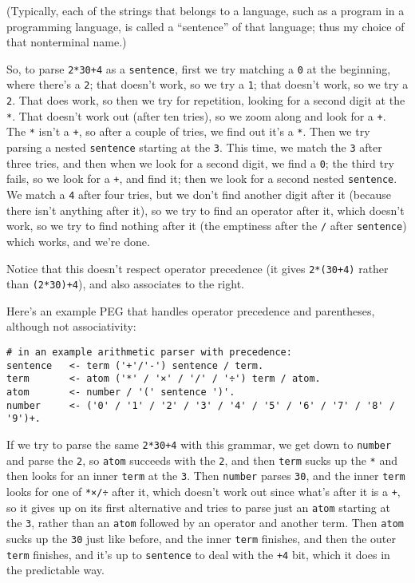 \documentclass[
]{article}
\begin{document}
(Typically, each of the strings that belongs to a language, such as a
program in a programming language, is called a ``sentence'' of that
language; thus my choice of that nonterminal name.)

So, to parse \texttt{2*30+4} as a \texttt{sentence}, first we try
matching a \texttt{0} at the beginning, where there's a \texttt{2}; that
doesn't work, so we try a \texttt{1}; that doesn't work, so we try a
\texttt{2}. That does work, so then we try for repetition, looking for a
second digit at the \texttt{*}. That doesn't work out (after ten tries),
so we zoom along and look for a \texttt{+}. The \texttt{*} isn't a
\texttt{+}, so after a couple of tries, we find out it's a \texttt{*}.
Then we try parsing a nested \texttt{sentence} starting at the
\texttt{3}. This time, we match the \texttt{3} after three tries, and
then when we look for a second digit, we find a \texttt{0}; the third
try fails, so we look for a \texttt{+}, and find it; then we look for a
second nested \texttt{sentence}. We match a \texttt{4} after four tries,
but we don't find another digit after it (because there isn't anything
after it), so we try to find an operator after it, which doesn't work,
so we try to find nothing after it (the emptiness after the \texttt{/}
after \texttt{sentence}) which works, and we're done.

Notice that this doesn't respect operator precedence (it gives
\texttt{2*(30+4)} rather than \texttt{(2*30)+4}), and also associates to
the right.

Here's an example PEG that handles operator precedence and parentheses,
although not associativity:

\begin{verbatim}
# in an example arithmetic parser with precedence:
sentence   <- term ('+'/'-') sentence / term.
term       <- atom ('*' / '×' / '/' / '÷') term / atom.
atom       <- number / '(' sentence ')'.
number     <- ('0' / '1' / '2' / '3' / '4' / '5' / '6' / '7' / '8' / '9')+.
\end{verbatim}

If we try to parse the same \texttt{2*30+4} with this grammar, we get
down to \texttt{number} and parse the \texttt{2}, so \texttt{atom}
succeeds with the \texttt{2}, and then \texttt{term} sucks up the
\texttt{*} and then looks for an inner \texttt{term} at the \texttt{3}.
Then \texttt{number} parses \texttt{30}, and the inner \texttt{term}
looks for one of \texttt{*×/÷} after it, which doesn't work out since
what's after it is a \texttt{+}, so it gives up on its first alternative
and tries to parse just an \texttt{atom} starting at the \texttt{3},
rather than an \texttt{atom} followed by an operator and another term.
Then \texttt{atom} sucks up the \texttt{30} just like before, and the
inner \texttt{term} finishes, and then the outer \texttt{term} finishes,
and it's up to \texttt{sentence} to deal with the \texttt{+4} bit, which
it does in the predictable way.
\end{document}
